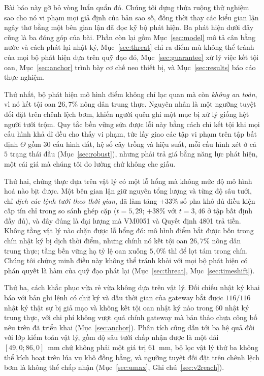 Bài báo này gỡ bỏ vòng luẩn quẩn đó. Chúng tôi dựng thửa ruộng thử nghiệm sao cho nó vi
phạm mọi giả định của bản sao số, đồng thời thay các kiểu gian lận ngây thơ bằng một bên gian lận đã đọc kỹ bộ phát hiện. Ba phát hiện dưới đây cũng là ba đóng góp của bài. Phần còn
lại gồm Mục~\ref{sec:model} mô tả cân bằng nước và cách phát lại nhật ký,
Mục~\ref{sec:threat} chỉ ra điểm mù không thể tránh của mọi bộ phát hiện dựa trên quỹ đạo đó,
Mục~\ref{sec:guarantee} xử lý việc kết tội oan, Mục~\ref{sec:anchor} trình bày cơ chế neo
thiết bị, và Mục~\ref{sec:results} báo cáo thực nghiệm.

Thứ nhất, bộ phát hiện mô hình điểm không chỉ lạc quan mà còn \emph{không an toàn}, vì nó
kết tội oan $26{,}7\%$ nông dân trung thực. Nguyên nhân là một ngưỡng tuyệt đối đặt trên
chênh lệch bơm, khiến người quên ghi một mục bị xử lý giống hệt người tưới trộm. Quy tắc
bền vững sửa được lỗi này bằng cách chỉ kết tội khi mọi cấu hình khả dĩ đều cho thấy vi
phạm, tức lấy giao các tập vi phạm trên tập bất định $\Theta$ gồm $30$ cấu hình đất, hệ số
cây trồng và hiệu suất, mỗi cấu hình xét ở cả $5$ trạng thái đầu (Mục~\ref{sec:robust}),
nhưng phải trả giá bằng năng lực phát hiện, một cái giá mà chúng tôi đo lường chứ không
che giấu.

Thứ hai, chứng thực dựa trên vật lý có một lỗ hổng mà không mức độ mô hình hoá nào bịt
được. Một bên gian lận giữ nguyên tổng lượng và từng độ sâu tưới, chỉ \emph{dịch các lệnh tưới
theo thời gian}, đã làm tăng $+33\%$ số pha khô đủ điều kiện cấp tín chỉ trong so sánh
ghép cặp ($t=5{,}29$; $+38\%$ với $t=3{,}46$ ở tập bất định đầy đủ), và đây đúng là đại
lượng mà VM0051 và Quyết định 4801 trả tiền. Không tầng vật lý nào chặn được lỗ hổng
đó: mô hình điểm bắt được bốn trong chín nhật ký bị dịch thời điểm, nhưng chính nó kết
tội oan $26{,}7\%$ nông dân trung thực; tầng bền vững hạ tỷ lệ oan xuống $5{,}0\%$ thì để
lọt tám trong chín. Chúng tôi chứng minh điều này không thể tránh khỏi với mọi bộ phát
hiện có phán quyết là hàm của quỹ đạo phát lại (Mục~\ref{sec:threat},
Mục~\ref{sec:timeshift}).

Thứ ba, cách khắc phục vừa rẻ vừa không dựa trên vật lý. Đối chiếu nhật ký khai báo với
bản ghi lệnh có chữ ký và dấu thời gian của gateway bắt được $116/116$ nhật ký thật sự bị
giả mạo và không kết tội oan nhật ký nào trong $60$ nhật ký trung thực, với chi phí không vượt quá chính gateway mà bản thảo chưa công bố nêu trên đã triển khai
(Mục~\ref{sec:anchor}). Phân tích cũng dẫn tới ba hệ quả đối với lớp kiểm toán vật lý, gồm
độ sâu tưới chấp nhận được là một dải $[49{,}0; 86{,}0]$~mm chứ không phải một giá trị $61$~mm,
bộ lọc vật lý thứ ba không thể kích hoạt trên lúa vụ khô đồng bằng, và ngưỡng tuyệt đối
đặt trên chênh lệch bơm là không thể chấp nhận (Mục~\ref{sec:umax},
Ghi chú~\ref{sec:v2reach}).